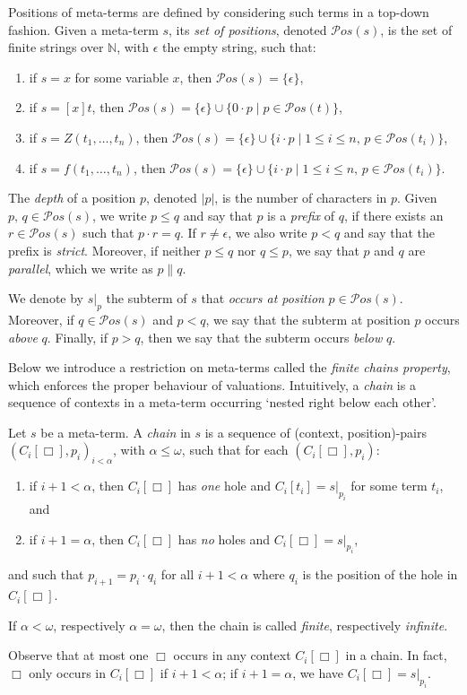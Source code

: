 \documentclass{LMCS}
\theoremstyle{definition}
\newcommand{\pos}[1]{\mathcal{P}os(#1)}
\newcommand{\natnum}{\mathbb{N}}
\newcommand{\seper}{\; | \;}
\begin{document}
Positions of meta-terms are defined by considering such terms in a top-down fashion. Given a meta-term $s$, its \emph{set of positions}, denoted $\pos{s}$, is the set of finite strings over $\natnum$, with $\epsilon$ the empty string, such that:
\begin{enumerate}[(1)]
\item
if $s = x$ for some variable $x$, then $\pos{s} = \{ \epsilon \}$,
\item
if $s = [x] t$, then $\pos{s} = \{ \epsilon \} \cup \{ 0 \cdot p \seper p \in \pos{t} \}$,
\item
if $s = Z(t_1, \ldots, t_n)$, then $\pos{s} = \{ \epsilon \} \cup \{ i \cdot p \seper 1 \leq i \leq n, \, p \in \pos{t_i} \}$,
\item
if $s = f(t_1, \ldots, t_n)$, then $\pos{s} = \{ \epsilon \} \cup \{ i \cdot p \seper 1 \leq i \leq n, \, p \in \pos{t_i} \}$.
\end{enumerate}

The \emph{depth} of a position $p$, denoted $\vert p \vert$, is the
number of characters in $p$. Given $p, \, q \in \pos{s}$, we write $p \leq q$
and say that $p$ is a \emph{prefix} of $q$, if there exists an $r \in \pos{s}$ such that $p \cdot r = q$. If
$r \not = \epsilon$, we also write $p < q$ and say that the prefix is
\emph{strict}. Moreover, if neither $p \leq q$ nor $q \leq p$, we say that $p$
and $q$ are \emph{parallel}, which we write as $p \parallel q$. 

We denote by $s|_p$ the subterm of $s$ that \emph{occurs at position} $p \in \pos{s}$. Moreover, if $q \in \pos{s}$ and $p < q$, we say that the subterm at position $p$ occurs \emph{above} $q$. Finally, if $p > q$, then we say that the subterm occurs \emph{below} $q$.

Below we introduce a restriction on meta-terms called the \emph{finite chains property}, which enforces the proper behaviour of valuations. Intuitively, a \emph{chain} is a sequence of contexts in a meta-term occurring `nested right below each other'.
\begin{defi}
Let $s$ be a meta-term.  A \emph{chain} in $s$ is a sequence
of (context, position)-pairs $(C_i[\Box],p_i)_{i < \alpha}$, with
$\alpha \leq \omega$, such that for each $(C_i[\Box], p_i)$:
\begin{enumerate}[(1)]
\item
if $i + 1 < \alpha$, then $C_i[\Box]$ has \emph{one} hole and $C_i[t_i] = s|_{p_i}$ for some term $t_i$, and
\item
if $i + 1 = \alpha$, then $C_i[\Box]$ has \emph{no} holes and $C_i[\Box] = s|_{p_i}$,
\end{enumerate}
and such that $p_{i+1} = p_i \cdot q_i$ for all $i + 1 < \alpha$ where $q_i$ is the position of the hole in $C_i[\Box]$.

If $\alpha < \omega$, respectively
$\alpha = \omega$, then the chain is called \emph{finite},
respectively \emph{infinite}.
\end{defi}
\noindent Observe that at most one $\Box$ occurs in any context $C_i[\Box]$ in a chain. In fact, $\Box$ only occurs in $C_i[\Box]$ if $i + 1 < \alpha$; if $i + 1 = \alpha$, we have $C_i[\Box] = s|_{p_i}$.
\end{document}
